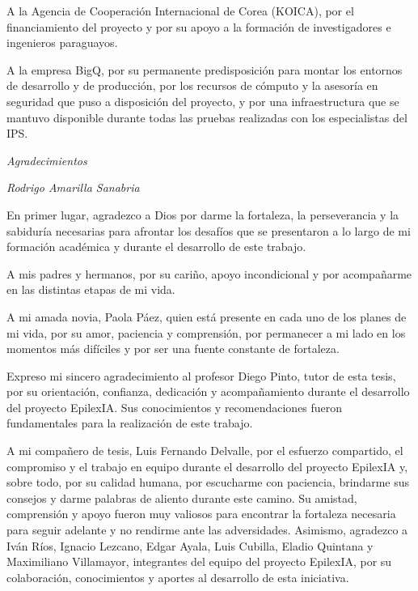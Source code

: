 {A la Agencia de Cooperación Internacional de Corea (KOICA), por el financiamiento del proyecto y por su apoyo a la formación de investigadores e ingenieros paraguayos.

A la empresa BigQ, por su permanente predisposición para montar los entornos de desarrollo y de producción, por los recursos de cómputo y la asesoría en seguridad que puso a disposición del proyecto, y por una infraestructura que se mantuvo disponible durante todas las pruebas realizadas con los especialistas del IPS.

}

\clearpage



\begingroup

\thispagestyle{empty}

\begin{center}
    {\huge\textit{Agradecimientos}\par}
\end{center}

\vspace{1em}

\begin{flushright}
\textit{Rodrigo Amarilla Sanabria}
\end{flushright}


En primer lugar, agradezco a Dios por darme la fortaleza,
la perseverancia y la sabiduría necesarias para afrontar
los desafíos que se presentaron a lo largo de mi formación
académica y durante el desarrollo de este trabajo.

A mis padres y hermanos, por su cariño, apoyo incondicional
y por acompañarme en las distintas etapas de mi vida.

A mi amada novia, Paola Páez, quien está presente
en cada uno de los planes de mi vida, por su amor,
paciencia y comprensión, por permanecer a mi lado
en los momentos más difíciles y por ser una fuente
constante de fortaleza.

Expreso mi sincero agradecimiento al profesor Diego Pinto,
tutor de esta tesis, por su orientación, confianza,
dedicación y acompañamiento durante el desarrollo del
proyecto EpilexIA. Sus conocimientos y recomendaciones
fueron fundamentales para la realización de este trabajo.


A mi compañero de tesis, Luis Fernando Delvalle,
por el esfuerzo compartido, el compromiso y el
trabajo en equipo durante el desarrollo del proyecto EpilexIA y,
sobre todo, por su calidad humana, por
escucharme con paciencia, brindarme sus consejos
y darme palabras de aliento durante este camino.
Su amistad, comprensión y apoyo fueron muy
valiosos para encontrar la fortaleza necesaria
para seguir adelante y no rendirme ante las
adversidades. Asimismo,
agradezco a Iván Ríos, Ignacio Lezcano, Edgar Ayala,
Luis Cubilla, Eladio Quintana y Maximiliano Villamayor,
integrantes del equipo del proyecto EpilexIA, por su colaboración,
conocimientos y aportes al desarrollo de esta iniciativa.

